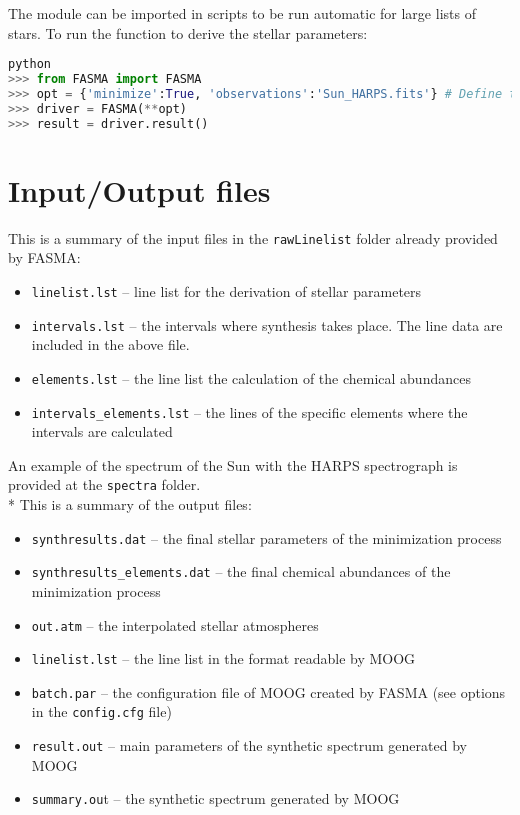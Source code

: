 \documentclass[a4paper,12pt]{article}
\begin{document}
The module can be imported in scripts to be run automatic for large lists of stars. To run the function to derive the stellar parameters:
{\footnotesize
\begin{lstlisting}[language=Python]
python
>>> from FASMA import FASMA
>>> opt = {'minimize':True, 'observations':'Sun_HARPS.fits'} # Define the options here
>>> driver = FASMA(**opt)
>>> result = driver.result()
\end{lstlisting}}

\section{Input/Output files}

This is a summary of the input files in the \texttt{rawLinelist} folder already provided by FASMA:
\begin{itemize}
 \item \texttt{linelist.lst} -- line list for the derivation of stellar parameters
 \item \texttt{intervals.lst} -- the intervals where synthesis takes place. The line data are included in the above file. 
 \item \texttt{elements.lst} -- the line list the calculation of the chemical abundances
 \item \texttt{intervals\_elements.lst} -- the lines of the specific elements where the intervals are calculated 
\end{itemize}

An example of the spectrum of the Sun with the HARPS spectrograph is provided at the \texttt{spectra} folder.
\\*
This is a summary of the output files:
\begin{itemize}
 \item \texttt{synthresults.dat} -- the final stellar parameters of the minimization process 
 \item \texttt{synthresults\_elements.dat} -- the final chemical abundances of the minimization process 
 \item \texttt{out.atm} -- the interpolated stellar atmospheres 
 \item \texttt{linelist.lst} -- the line list in the format readable by MOOG
 \item \texttt{batch.par} -- the configuration file of MOOG created by FASMA (see options in the \texttt{config.cfg} file)
 \item \texttt{result.out} -- main parameters of the synthetic spectrum generated by MOOG
 \item \texttt{summary.ou}t -- the synthetic spectrum generated by MOOG
\end{itemize}
\end{document}
